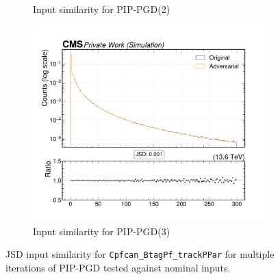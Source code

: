 \begin{figure}[htbp]
\begin{subfigure}[t]{0.32\textwidth}
    \caption*{Input similarity for PIP-PGD(2)}
  \end{subfigure}\hfill
  \begin{subfigure}[t]{0.32\textwidth}
    \includegraphics[width=\linewidth]{media/output/features/compare/combined_it_3/cmp_cpf_arr_Cpfcan_BtagPf_trackPPar.pdf}
    \caption*{Input similarity for PIP-PGD(3)}
  \end{subfigure}

  \caption*{JSD input similarity for \texttt{Cpfcan\_BtagPf\_trackPPar} for multiple iterations of PIP-PGD tested against nominal inputs.}
  \label{fig:combined_input_Cpfcan_BtagPf_trackPPar}
\end{figure}

